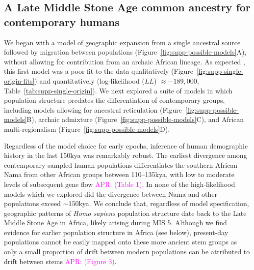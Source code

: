 \documentclass[]{article}
\newcommand{\aprcomment}[1]{{\textcolor{magenta}{APR: #1}}}
\begin{document}
\subsection*{A Late Middle Stone Age common ancestry for contemporary humans}

We began with a model of geographic expansion from a single ancestral source
followed by migration between populations
(Figure~\ref{fig:supp-possible-models}A), without allowing for contribution
from an archaic African lineage. As expected \citep{Ragsdale2019-nt}, this
first model was a poor fit to the data qualitatively
(Figure~\ref{fig:supp-single-origin-fits}) and quantitatively (log-likelihood
($LL$) $\approx -189,000$, Table~\ref{tab:supp-single-origin}). We next explored a
suite of models in which population structure predates the differentiation of
contemporary groups, including models allowing for ancestral reticulation
(Figure~\ref{fig:supp-possible-models}B), archaic admixture
(Figure~\ref{fig:supp-possible-models}C), and African multi-regionalism
(Figure~\ref{fig:supp-possible-models}D).

Regardless of the model choice for early epochs, inference of human
demographic history in the last 150kya was remarkably robust. The earliest divergence
among contemporary sampled human populations differentiates the southern
African Nama from other African groups between 110--135kya, with low to moderate
levels of subsequent gene flow \aprcomment{(Table 1)}. In none of the
high-likelihood models which we explored did the divergence between Nama and
other populations exceed $\sim$150kya. We conclude that, regardless of model
specification, geographic patterns of \emph{Homo sapiens} population structure
date back to the Late Middle Stone Age in Africa, likely arising during MIS 5.
Although we find evidence for earlier population structure in Africa (see
below), present-day populations cannot be easily mapped onto these more ancient
stem groups as only a small proportion of drift between modern populations can
be attributed to drift between stems \aprcomment{(Figure 3)}. 
\end{document}
